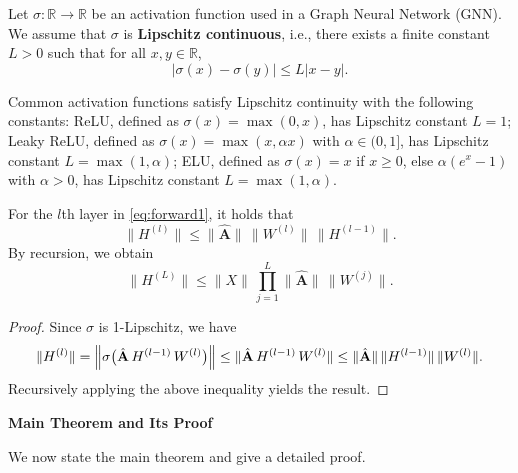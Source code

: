 \begin{assumption}
Let \( \sigma: \mathbb{R} \to \mathbb{R} \) be an activation function used in a Graph Neural Network (GNN). We assume that \( \sigma \) is \textbf{Lipschitz continuous}, i.e., there exists a finite constant \( L > 0 \) such that for all \( x, y \in \mathbb{R} \),
\begin{equation}
    |\sigma(x) - \sigma(y)| \leq L |x - y|.
\end{equation}
\end{assumption}

\begin{remark}
Common activation functions satisfy Lipschitz continuity with the following constants:  ReLU, defined as $\sigma(x) = \max(0, x)$, has Lipschitz constant $L = 1$; Leaky ReLU, defined as $\sigma(x) = \max(x, \alpha x)$ with $\alpha \in (0,1]$, has Lipschitz constant $L = \max(1, \alpha)$;
 ELU, defined as $\sigma(x) = x$ if $x \geq 0$, else $\alpha (e^x - 1)$ with $\alpha > 0$, has Lipschitz constant $L = \max(1, \alpha)$.  
\end{remark}





\begin{lemma}
\label{lem:layer-norm}
For the \(l\)th layer in \eqref{eq:forward1}, it holds that
\[
\|H^{(l)}\| \le \|\hat{\mathbf{A}}\|\,\|W^{(l)}\|\,\|H^{(l-1)}\|.
\]
By recursion, we obtain
\[
\|H^{(L)}\| \le \|X\|\,\prod_{j=1}^{L} \|\hat{\mathbf{A}}\|\,\|W^{(j)}\|.
\]
\end{lemma}

\begin{proof}
Since \(\sigma\) is 1-Lipschitz, we have
\[
\|H^{(l)}\| = \Bigl\|\sigma\bigl(\hat{\mathbf{A}}\,H^{(l-1)}\,W^{(l)}\bigr)\Bigr\| \le \|\hat{\mathbf{A}}\,H^{(l-1)}\,W^{(l)}\| \le \|\hat{\mathbf{A}}\|\,\|H^{(l-1)}\|\,\|W^{(l)}\|.
\]
Recursively applying the above inequality yields the result.
\end{proof}

\noindent\textbf{Main Theorem and Its Proof}

We now state the main theorem and give a detailed proof.

